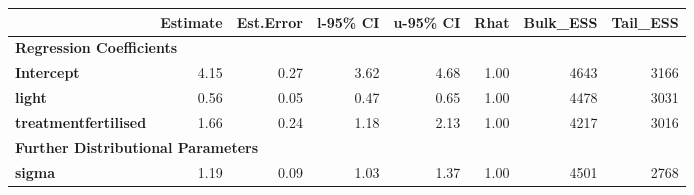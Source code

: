 \begin{tabular}{lrrrrrrr}
  \toprule
   & \textbf{Estimate} & \textbf{Est.Error} & \textbf{l-95\% CI} & \textbf{u-95\% CI} & \textbf{Rhat} & \textbf{Bulk\_ESS} & \textbf{Tail\_ESS} \\
  \midrule
  \multicolumn{8}{l}{\textbf{Regression Coefficients}} \\
  \midrule
  \textbf{Intercept} & 4.15 & 0.27 & 3.62 & 4.68 & 1.00 & 4643 & 3166 \\
  \textbf{light} & 0.56 & 0.05 & 0.47 & 0.65 & 1.00 & 4478 & 3031 \\
  \textbf{treatmentfertilised} & 1.66 & 0.24 & 1.18 & 2.13 & 1.00 & 4217 & 3016 \\
  \midrule
  \multicolumn{8}{l}{\textbf{Further Distributional Parameters}} \\
  \midrule
  \textbf{sigma} & 1.19 & 0.09 & 1.03 & 1.37 & 1.00 & 4501 & 2768 \\
  \bottomrule
\end{tabular}
